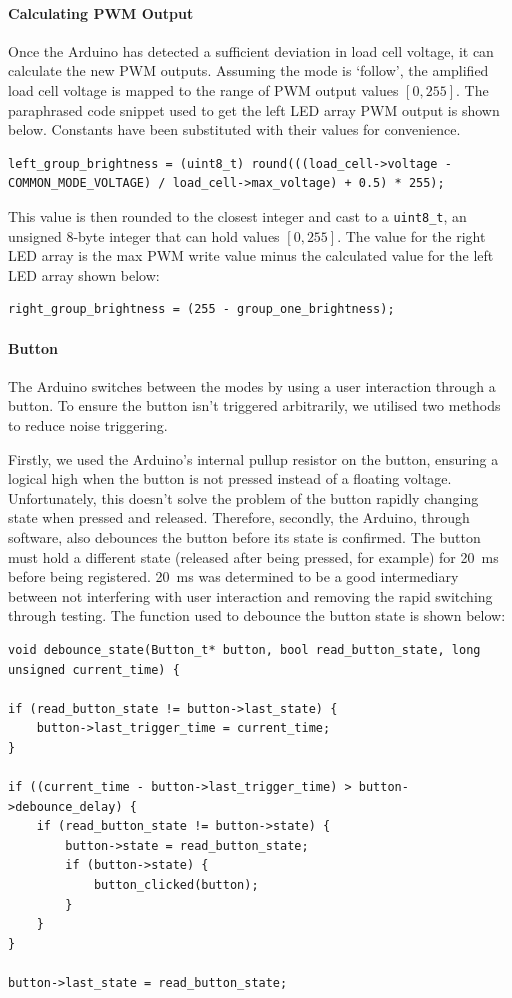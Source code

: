 \documentclass[twoside]{article}
\begin{document}
            \paragraph{Calculating PWM Output}
            Once the Arduino has detected a sufficient deviation in load cell voltage, it can calculate the new PWM outputs. Assuming the mode is `follow', the amplified load cell voltage is mapped to the range of PWM output values \(\left[0, 255\right]\). The paraphrased code snippet used to get the left LED array PWM output is shown below. Constants have been substituted with their values for convenience. 
            \begin{lstlisting}
left_group_brightness = (uint8_t) round(((load_cell->voltage - COMMON_MODE_VOLTAGE) / load_cell->max_voltage) + 0.5) * 255);
            \end{lstlisting}
            This value is then rounded to the closest integer and cast to a \texttt{uint8\_t}, an unsigned 8-byte integer that can hold values \(\left[0, 255\right]\). The value for the right LED array is the max PWM write value minus the calculated value for the left LED array shown below:
            \begin{lstlisting}
right_group_brightness = (255 - group_one_brightness); 
            \end{lstlisting}
            \paragraph{Button}
            The Arduino switches between the modes by using a user interaction through a button. To ensure the button isn't triggered arbitrarily, we utilised two methods to reduce noise triggering. 

            Firstly, we used the Arduino's internal pullup resistor on the button, ensuring a logical high when the button is not pressed instead of a floating voltage. Unfortunately, this doesn't solve the problem of the button rapidly changing state when pressed and released. Therefore, secondly, the Arduino, through software, also debounces the button before its state is confirmed. The button must hold a different state (released after being pressed, for example) for \SI{20}{\milli\second} before being registered. \SI{20}{\milli\second} was determined to be a good intermediary between not interfering with user interaction and removing the rapid switching through testing. The function used to debounce the button state is shown below:
            \begin{lstlisting}
void debounce_state(Button_t* button, bool read_button_state, long unsigned current_time) {     

if (read_button_state != button->last_state) { 
    button->last_trigger_time = current_time; 
} 

if ((current_time - button->last_trigger_time) > button->debounce_delay) { 
    if (read_button_state != button->state) { 
        button->state = read_button_state; 
        if (button->state) { 
            button_clicked(button); 
        } 
    }
} 

button->last_state = read_button_state; 
            \end{lstlisting}
\end{document}
